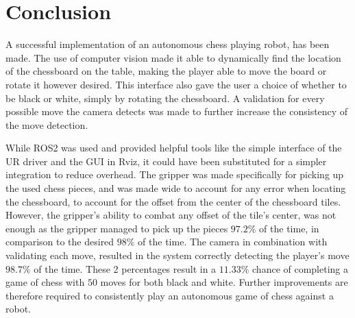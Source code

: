 \section{Conclusion}
A successful implementation of an autonomous chess playing robot, has been made. The use of computer vision made it able to dynamically find the location of the chessboard on the table, making the player able to move the board or rotate it however desired. This interface also gave the user a choice of whether to be black or white, simply by rotating the chessboard. A validation for every possible move the camera detects was made to further increase the consistency of the move detection. 

While ROS2 was used and provided helpful tools like the simple interface of the UR driver and the GUI in Rviz, it could have been substituted for a simpler integration to reduce overhead. The gripper was made specifically for picking up the used chess pieces, and was made wide to account for any error when locating the chessboard, to account for the offset from the center of the chessboard tiles. However, the gripper's ability to combat any offset of the tile's center, was not enough as the gripper managed to pick up the pieces $97.2 \%$ of the time, in comparison to the desired $98\%$ of the time. The camera in combination with validating each move, resulted in the system correctly detecting the player's move $98.7 \%$ of the time. These 2 percentages result in a $11.33 \%$ chance of completing a game of chess with $50$ moves for both black and white. Further improvements are therefore required to consistently play an autonomous game of chess against a robot.